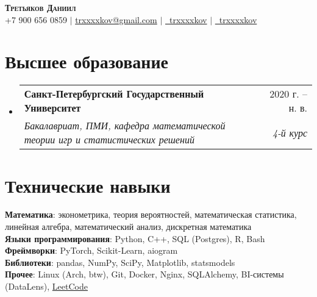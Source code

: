 \documentclass[a4paper, 11pt]{article}
\makeatletter
\newcommand{\resumeSubheading}[4]{
  \vspace{-2pt}\item
    \begin{tabular*}{0.97\textwidth}[t]{l@{\extracolsep{\fill}}r}
      \textbf{#1} & #2 \\
      \textit{\small#3} & \textit{\small #4} \\
    \end{tabular*}\vspace{-7pt}
}
\newcommand{\resumeSubHeadingListStart}{\begin{itemize}[leftmargin=0.15in, label={}]}
\newcommand{\resumeSubHeadingListEnd}{\end{itemize}}
\makeatother
\begin{document}
\begin{center}
    \textbf{\Huge \scshape Третьяков Даниил} \\ \vspace{5pt}
    \small +7 900 656 0859 $|$ \href{mailto:trxxxxkov@gmail.com}{trxxxxkov@gmail.com} $|$
    \href{https://t.me/trxxxxkov}{\faTelegram \ trxxxxkov} $|$  \href{https://github.com/trxxxxkov}{\faGithub \ trxxxxkov}
\end{center}


\section{Высшее образование}
  \resumeSubHeadingListStart
    \resumeSubheading
      {Санкт-Петербургский Государственный Университет}{2020 г. -- н. в.}
      {Бакалавриат, ПМИ, кафедра математической теории игр и статистических решений}
      {4-й курс}
  \resumeSubHeadingListEnd


\section{Технические навыки}
 \begin{itemize}[leftmargin=0.15in, label={}]
    \small{\item{
        \textbf{Математика}{: эконометрика, теория вероятностей, математическая статистика, линейная алгебра, математический анализ, дискретная математика} \\    
        \vspace{3pt}
        \textbf{Языки программирования}{: Python, C++, SQL (Postgres), R, Bash} \\
        \vspace{3pt}
        \textbf{Фреймворки}{: PyTorch, Scikit-Learn, aiogram} \\
        \vspace{3pt}
        \textbf{Библиотеки}{: pandas, NumPy, SciPy, Matplotlib, statsmodels} \\
        \vspace{3pt}
        \textbf{Прочее}{: Linux (Arch, btw), Git, Docker, Nginx, SQLAlchemy, BI-системы (DataLens), \href{https://leetcode.com/u/trxxxxkov/}{LeetCode}} \\
    }}
 \end{itemize}

\end{document}
